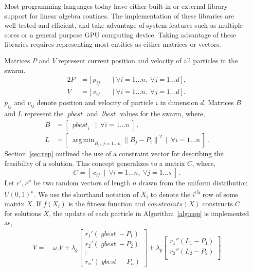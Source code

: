 \documentclass[10pt]{article}
\newcommand{\tsup}{\textsuperscript}
\DeclareMathOperator*{\argmin}{arg\,min}
\DeclareMathOperator*{\pbest}{\mathit{pbest}}
\DeclareMathOperator*{\gbest}{\mathit{gbest}}
\DeclareMathOperator*{\lbest}{\mathit{lbest}}
\begin{document}
\begin{appendices}
  Most programming languages today have either built-in or external library support for linear algebra routines. The
  implementation of these libraries are well-tested and efficient, and take advantage of system features such as
  multiple cores or a general purpose GPU computing device. Taking advantage of these libraries requires representing
  most entities as either matrices or vectors. 

  Matrices $P$ and $V$ represent current position and velocity of all particles in the swarm.
  \begin{alignat*}{2}
    P &= [\ p_{ij}\ &&\mid\ \forall i=1\dots n,\;\forall j=1\dots d\ ]\,,\\
    V &= [\ v_{ij}\ &&\mid\ \forall i=1\dots n,\;\forall j=1\dots d\ ]\,.
  \end{alignat*}
  $p_{ij}$ and $v_{ij}$ denote position and velocity of particle $i$ in dimension $d$. Matrices $B$ and $L$ represent
  the $\pbest$ and $\lbest$ values for the swarm, where,
  \begin{align*}
    B &= [\ {\pbest}_i\ \mid\ \forall i=1\dots n\ ]\,,\\
    L &= [\ \argmin_{B_j,\ j = 1\dots n} {\|B_j - P_i\|}^2\ \mid\ \forall i=1\dots n\ ]\,.
  \end{align*}
  Section~\ref{sec:rep} outlined the use of a constraint vector for describing the feasibility of a solution. This
  concept generalizes to a matrix $C$, where,
  \begin{equation*}
    C = [\ c_{ij}\ \mid\ \forall i=1\dots n,\;\forall j=1\dots s\ ]\,.
  \end{equation*}
  Let $r',r''$ be two random vectors of length $n$ drawn from the uniform distribution ${U(0,1)}^n$. We use the
  shorthand notation of $X_i$ to denote the $i$\tsup{th} row of some matrix $X$. If $f(X_i)$ is the fitness function and
  $\mathit{constraints}(X)$ constructs $C$ for solutions $X$, the update of each particle in Algorithm~\ref{alg:cop} is
  implemented as,
  \begin{align*}
    V  =&\ \omega.V + \lambda_g\begin{bmatrix}
      {r_1}'(\gbest - P_1)\\
      {r_2}'(\gbest - P_2)\\
      \vdots\\
      {r_n}'(\gbest - P_n)
    \end{bmatrix} + \lambda_p\begin{bmatrix}
      {r_1}''(L_1 - P_1)\\
      {r_2}''(L_2 - P_2)\\

\end{bmatrix}
\end{align*}
\end{appendices}
\end{document}
